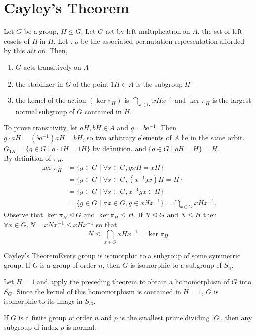 \documentclass{report}
\newcommand{\thm}[2]{\begin{Theorem}{#1}{}#2\end{Theorem}}
\newcommand{\cor}[2]{\begin{Corollary}{#1}{}#2\end{Corollary}}
\newenvironment{myproof}[1][\proofname]{%
	\proof[\bfseries #1: ]%
}{\endproof}
\begin{document}
\section{Cayley's Theorem}
\thm{}{Let $G$ be a group, $H \leq G$. Let $G$ act by left multiplication on $A$, the set of left cosets of $H$ in $H$. Let $\pi_H$ be the associated permutation representation afforded by this action. Then, 
\begin{enumerate}
    \item $G$ acts transitively on $A$
    \item the stabilizer in $G$ of the point $1H \in A$ is the subgroup $H$
    \item the kernel of the action $(\ker \pi_H)$ is $\bigcap_{x \in G} xHx^{-1}$ and $\ker \pi_H$ is the largest normal subgroup of $G$ contained in $H$. 
\end{enumerate}}
\begin{myproof}
    To prove transitivity, let $aH, bH\in A$ and $g = ba^{-1}$. Then $g \cdot aH = (ba^{-1})aH = bH$, so two arbitrary elements of $A$ lie in the same orbit. \\
    $G_{1H} = \{g \in G \mid g \cdot 1H = 1H\}$ by definition, and $\{g \in G \mid gH = H\} = H$. \\
    By definition of $\pi_H$, 
    \begin{align*}
        \ker \pi_H &= \{g \in G \mid \forall x \in G, gxH = xH\}\\
        &=\{g \in G \mid \forall x \in G, (x^{-1}gx)H = H\}\\
        &=\{g \in G \mid \forall x \in G, x^{-1}gx \in H\}\\
        &=\{g \in G \mid \forall x \in G, g \in xHx^{-1}\} = \bigcap_{x\in G} xHx^{-1}.
    \end{align*}
    Observe that $\ker \pi_H \unlhd G$ and $\ker \pi_H \leq H$. If $N\unlhd G$ and $N \leq H$ then $\forall x \in G, N = xNx^{-1} \leq xHx^{-1}$ so that 
    $$N \leq \bigcap_{x \in G} xHx^{-1} = \ker \pi_H$$
\end{myproof}
\cor{Cayley's Theorem}{Every group is isomorphic to a subgroup of some symmetric group. If $G$ is a group of order $n$, then $G$ is isomorphic to a subgroup of $S_n$. }
\begin{myproof}
    Let $H =1$ and apply the preceding theorem to obtain a homomorphism of $G$ into $S_G$. Since the kernel of this homomorphism is contained in $H = 1$, $G$ is isomorphic to its image in $S_G$.  
\end{myproof}
\cor{}{If $G$ is a finite group of order $n$ and $p$ is the smallest prime dividing $|G|$, then any subgroup of index $p$ is normal. }
\end{document}
